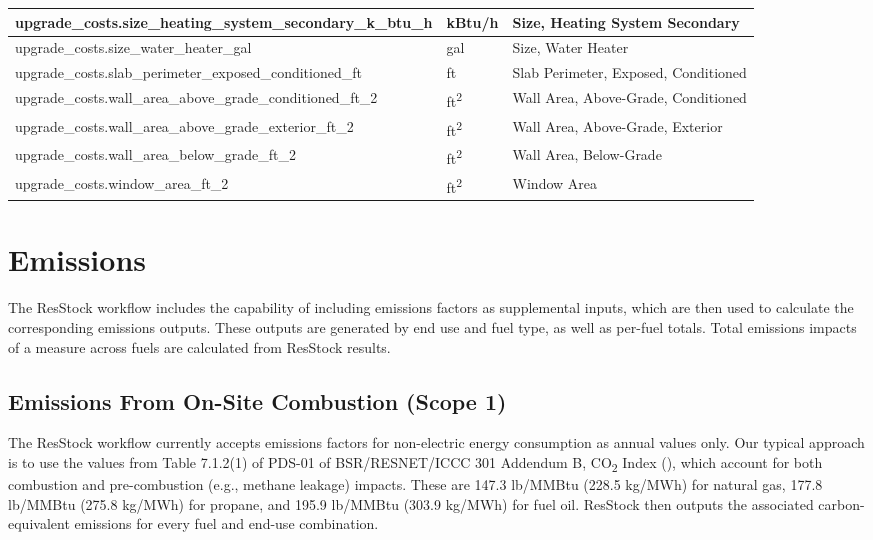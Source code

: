 \begin{longtable}[]{ |p{}|p{2.5cm}|p{6cm}| }
upgrade\_costs.size\_heating\_system\_secondary\_k\_btu\_h & kBtu/h & Size, Heating System Secondary \\ \hline
upgrade\_costs.size\_water\_heater\_gal & gal & Size, Water Heater \\ \hline
upgrade\_costs.slab\_perimeter\_exposed\_conditioned\_ft & ft & Slab Perimeter, Exposed, Conditioned \\ \hline
upgrade\_costs.wall\_area\_above\_grade\_conditioned\_ft\_2 & ft\textsuperscript{2}& Wall Area, Above-Grade, Conditioned \\ \hline
upgrade\_costs.wall\_area\_above\_grade\_exterior\_ft\_2 & ft\textsuperscript{2}& Wall Area, Above-Grade, Exterior \\ \hline
upgrade\_costs.wall\_area\_below\_grade\_ft\_2 & ft\textsuperscript{2}& Wall Area, Below-Grade \\ \hline
upgrade\_costs.window\_area\_ft\_2 & ft\textsuperscript{2}& Window Area
\end{longtable}

\section{Emissions}
The ResStock workflow includes the capability of including emissions factors as supplemental inputs, which are then used to calculate the corresponding emissions outputs. These outputs are generated by end use and fuel type, as well as per-fuel totals. Total emissions impacts of a measure across fuels are calculated from ResStock results.

\subsection{Emissions From On-Site Combustion (Scope 1)}
The ResStock workflow currently accepts emissions factors for non-electric energy consumption as annual values only. Our typical approach is to use the values from Table 7.1.2(1) of PDS-01 of BSR/RESNET/ICCC 301 Addendum B, CO\textsubscript{2} Index (\cite{RESNET2022}), which account for both combustion and pre-combustion (e.g., methane leakage) impacts. These are 147.3 lb/MMBtu (228.5 kg/MWh) for natural gas, 177.8 lb/MMBtu (275.8 kg/MWh) for propane, and 195.9 lb/MMBtu (303.9 kg/MWh) for fuel oil. ResStock then outputs the associated carbon-equivalent emissions for every fuel and end-use combination. 

